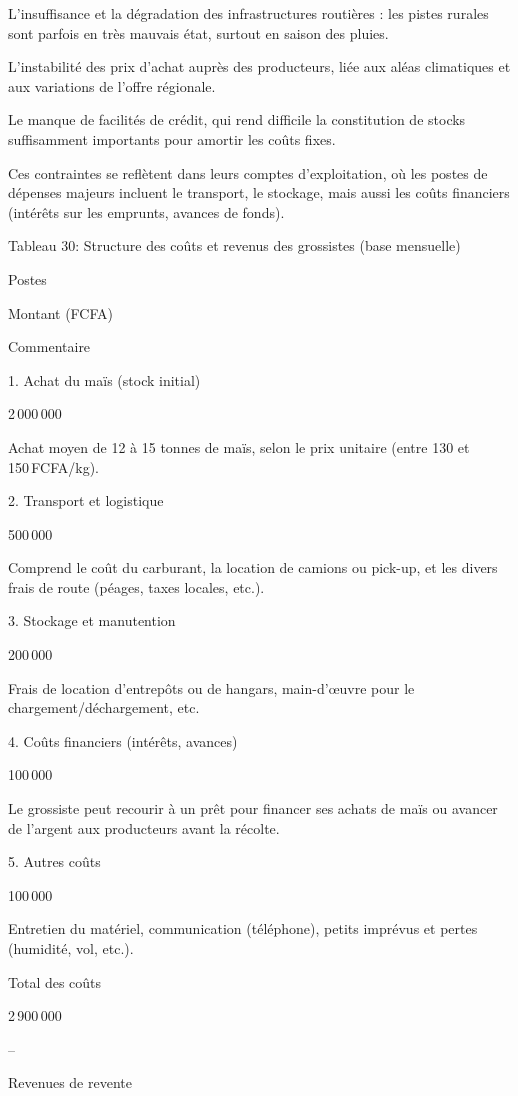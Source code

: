 \documentclass[12pt,oneside]{report}
\begin{document}
L’insuffisance et la dégradation des infrastructures routières : les pistes rurales sont parfois en très mauvais état, surtout en saison des pluies.

L’instabilité des prix d’achat auprès des producteurs, liée aux aléas climatiques et aux variations de l’offre régionale.

Le manque de facilités de crédit, qui rend difficile la constitution de stocks suffisamment importants pour amortir les coûts fixes.

Ces contraintes se reflètent dans leurs comptes d’exploitation, où les postes de dépenses majeurs incluent le transport, le stockage, mais aussi les coûts financiers (intérêts sur les emprunts, avances de fonds).

Tableau 30: Structure des coûts et revenus des grossistes (base mensuelle)

Postes

Montant (FCFA)

Commentaire

1. Achat du maïs (stock initial)

2 000 000

Achat moyen de 12 à 15 tonnes de maïs, selon le prix unitaire (entre 130 et 150 FCFA/kg).

2. Transport et logistique

500 000

Comprend le coût du carburant, la location de camions ou pick-up, et les divers frais de route (péages, taxes locales, etc.).

3. Stockage et manutention

200 000

Frais de location d’entrepôts ou de hangars, main-d’œuvre pour le chargement/déchargement, etc.

4. Coûts financiers (intérêts, avances)

100 000

Le grossiste peut recourir à un prêt pour financer ses achats de maïs ou avancer de l’argent aux producteurs avant la récolte.

5. Autres coûts

100 000

Entretien du matériel, communication (téléphone), petits imprévus et pertes (humidité, vol, etc.).

Total des coûts

2 900 000

–

Revenues de revente
\end{document}
